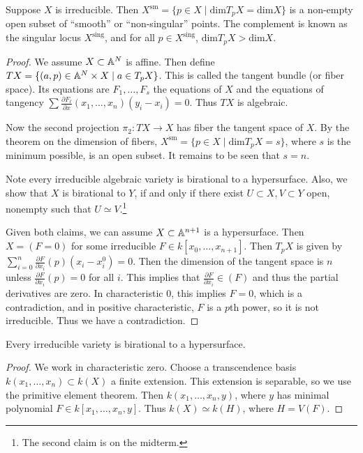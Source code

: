 \documentclass[twoside, 10pt]{article}
\begin{document}
    \begin{thm}
        Suppose $X$ is irreducible. Then $X^{\mathrm{sm}} = \{p \in X \mid \mathrm{dim}T_p X = \mathrm{dim} X \}$ is a non-empty open subset of ``smooth'' or ``non-singular'' points. The complement is known as the singular locus $X^{\mathrm{sing}}$, and for all $p \in X^{\mathrm{sing}}$, $\mathrm{dim}T_pX > \mathrm{dim} X$.
        \begin{proof}
            We assume $X \subset \mathbb{A}^N$ is affine. Then define $TX = \{(a,p) \in \mathbb{A}^N \times X \mid a \in T_p X \}$. This is called the tangent bundle (or fiber space). Its equations are $F_1, \ldots, F_s$ the equations of $X$ and the equations of tangency $\sum \frac{\partial F_{\ell}}{\partial x}(x_1, \ldots, x_n) (y_i-x_i) = 0$. Thus $TX$ is algebraic.

            Now the second projection $\pi_2: TX \to X$ has fiber the tangent space of $X$. By the theorem on the dimension of fibers, $X^{\mathrm{sm}} = \{p \in X \mid \mathrm{dim}T_pX = s\}$, where $s$ is the minimum possible, is an open subset. It remains to be seen that $s = n$.

            Note every irreducible algebraic variety is birational to a hypersurface. Also, we show that $X$ is birational to $Y$, if and only if there exist $U \subset X, V \subset Y$ open, nonempty such that $U \simeq V$.\footnote{The second claim is on the midterm.}

            Given both claims, we can assume $X \subset \mathbb{A}^{n+1}$ is a hypersurface. Then $X = (F=0)$ for some irreducible $F \in k[x_0, \ldots, x_{n+1}]$. Then $T_pX$ is given by $\sum_{i=0}^n \frac{\partial F}{\partial x_i}(p)(x_i - x_i^0) = 0$. Then the dimension of the tangent space is $n$ unless $\frac{\partial F}{\partial x_i}(p) = 0$ for all $i$. This implies that $\frac{\partial F}{\partial x_i} \in (F)$ and thus the partial derivatives are zero. In characteristic $0$, this implies $F = 0$, which is a contradiction, and in positive characteristic, $F$ is a $p$th power, so it is not irreducible. Thus we have a contradiction.
        \end{proof}
    \end{thm}

    \begin{lem}
        Every irreducible variety is birational to a hypersurface. 
        \begin{proof}
            We work in characteristic zero. Choose a transcendence basis $k(x_1, \ldots, x_n) \subset k(X)$ a finite extension. This extension is separable, so we use the primitive element theorem. Then $k(x_1, \ldots, x_n, y)$, where $y$ has minimal polynomial $F \in k[x_1, \ldots, x_n, y]$. Thus $k(X) \simeq k(H)$, where $H = V(F)$.
        \end{proof}
    \end{lem}
\end{document}
